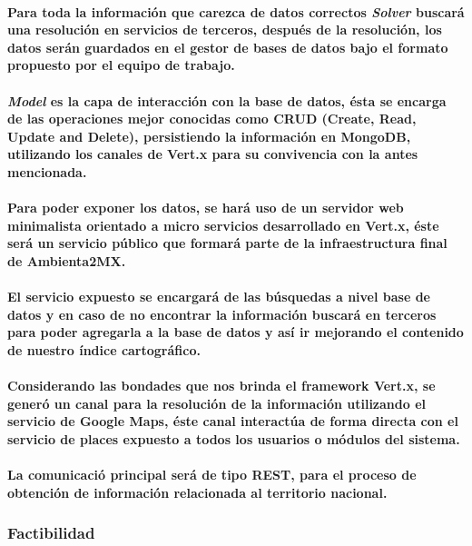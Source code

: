     \paragraph{Para toda la información que carezca de datos correctos \textbf{\emph{Solver}} buscará una resolución en servicios de terceros, después de la resolución, los datos serán guardados en el gestor de bases de datos bajo el formato propuesto por el equipo de trabajo.}
    \paragraph{\textbf{\emph{Model}} es la capa de interacción con la base de datos, ésta se encarga de las operaciones mejor conocidas como CRUD (Create, Read, Update and Delete),  persistiendo la información en MongoDB, utilizando los canales de Vert.x para su convivencia con la antes mencionada.}
    \paragraph{Para poder exponer los datos, se hará uso de un servidor web minimalista orientado a micro servicios desarrollado en Vert.x, éste será un servicio público que formará parte de la infraestructura final de Ambienta2MX.}
    \paragraph{El servicio expuesto se encargará de las búsquedas a nivel base de datos y en caso de no encontrar la información buscará en terceros para poder agregarla a la base de datos y así ir mejorando el contenido de nuestro índice cartográfico.}
    \paragraph{Considerando las bondades que nos brinda el framework Vert.x, se generó un canal para la resolución de la información utilizando el servicio de Google Maps, éste canal interactúa de forma directa con el servicio de places expuesto a todos los usuarios o módulos del sistema.}
    \paragraph{La comunicació principal será de tipo REST, para el proceso de 
    obtención de información relacionada al territorio nacional.}
  \subsubsection{Factibilidad}      
